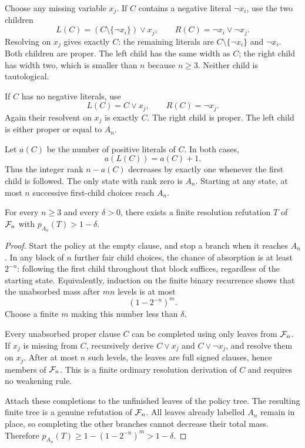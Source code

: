 \documentclass[11pt]{article}
\begin{document}
Choose any missing variable $x_j$. If $C$ contains a negative literal $\neg x_i$, use the two children
\begin{equation}\label{eq:negative}
 L(C)=(C\setminus\{\neg x_i\})\vee x_j,
 \qquad R(C)=\neg x_i\vee\neg x_j.
\end{equation}
Resolving on $x_j$ gives exactly $C$: the remaining literals are $C\setminus\{\neg x_i\}$ and $\neg x_i$. Both children are proper. The left child has the same width as $C$; the right child has width two, which is smaller than $n$ because $n\ge3$. Neither child is tautological.

If $C$ has no negative literals, use
\begin{equation}\label{eq:positive}
 L(C)=C\vee x_j,\qquad R(C)=\neg x_j.
\end{equation}
Again their resolvent on $x_j$ is exactly $C$. The right child is proper. The left child is either proper or equal to $A_n$.

Let $a(C)$ be the number of positive literals of $C$. In both cases,
\[
 a(L(C))=a(C)+1.
\]
Thus the integer rank $n-a(C)$ decreases by exactly one whenever the first child is followed. The only state with rank zero is $A_n$. Starting at any state, at most $n$ successive first-child choices reach $A_n$.

\begin{lemma}\label{lem:concentration}
For every $n\ge3$ and every $\delta>0$, there exists a finite resolution refutation $T$ of $\mathcal F_n$ with $p_{A_n}(T)>1-\delta$.
\end{lemma}
\begin{proof}
Start the policy at the empty clause, and stop a branch when it reaches $A_n$. In any block of $n$ further fair child choices, the chance of absorption is at least $2^{-n}$: following the first child throughout that block suffices, regardless of the starting state. Equivalently, induction on the finite binary recurrence shows that the unabsorbed mass after $mn$ levels is at most
\[
 (1-2^{-n})^m.
\]
Choose a finite $m$ making this number less than $\delta$.

Every unabsorbed proper clause $C$ can be completed using only leaves from $\mathcal F_n$. If $x_j$ is missing from $C$, recursively derive $C\vee x_j$ and $C\vee\neg x_j$, and resolve them on $x_j$. After at most $n$ such levels, the leaves are full signed clauses, hence members of $\mathcal F_n$. This is a finite ordinary resolution derivation of $C$ and requires no weakening rule.

Attach these completions to the unfinished leaves of the policy tree. The resulting finite tree is a genuine refutation of $\mathcal F_n$. All leaves already labelled $A_n$ remain in place, so completing the other branches cannot decrease their total mass. Therefore
$p_{A_n}(T)\ge1-(1-2^{-n})^m>1-\delta$.
\end{proof}
\end{document}
